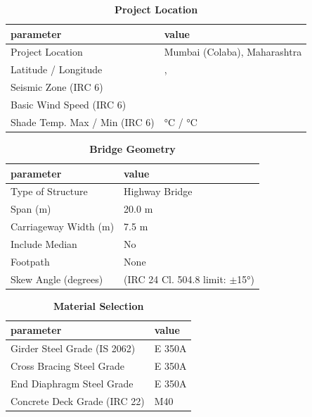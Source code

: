 \documentclass[12pt,a4paper]{report}
\numberwithin{table}{chapter}
\numberwithin{figure}{chapter}
\begin{document}
\begin{table}[H]
\caption{\textbf{Project Location}}
\label{subsec:project-location}
\begin{tabular}{|L{5.5cm}|L{8.5cm}|}
\hline
\textbf{parameter} & \textbf{value} \\
\hline
\textnormal{Project Location} & Mumbai (Colaba), Maharashtra \\
\hline
\textnormal{Latitude / Longitude} & ,  \\
\hline
\textnormal{Seismic Zone (IRC 6)} &  \\
\hline
\textnormal{Basic Wind Speed (IRC 6)} &  \\
\hline
\textnormal{Shade Temp. Max / Min (IRC 6)} &  °C /  °C \\
\hline
\end{tabular}
\vspace{0.4cm}
\end{table}

\begin{table}[H]
\caption{\textbf{Bridge Geometry}}
\label{subsec:bridge-geometry}
\begin{tabular}{|L{5.5cm}|L{8.5cm}|}
\hline
\textbf{parameter} & \textbf{value} \\
\hline
\textnormal{Type of Structure} & Highway Bridge \\
\hline
\textnormal{Span (m)} & 20.0 m \\
\hline
\textnormal{Carriageway Width (m)} & 7.5 m \\
\hline
\textnormal{Include Median} & No \\
\hline
\textnormal{Footpath} & None \\
\hline
\textnormal{Skew Angle (degrees)} &  (IRC 24 Cl. 504.8 limit: $\pm$15°) \\
\hline
\end{tabular}
\end{table}
\vspace{0.4cm}

\begin{table}[H]
\caption{\textbf{Material Selection}}
\label{subsec:material}
\begin{tabular}{|L{5.5cm}|L{8.5cm}|}
\hline
\textbf{parameter} & \textbf{value} \\
\hline
\textnormal{Girder Steel Grade (IS 2062)} & E 350A \\
\hline
\textnormal{Cross Bracing Steel Grade} & E 350A \\
\hline
\textnormal{End Diaphragm Steel Grade} & E 350A \\
\hline
\textnormal{Concrete Deck Grade (IRC 22)} & M40 \\
\hline
\end{tabular}
\end{table}
\vspace{0.4cm}
\end{document}
